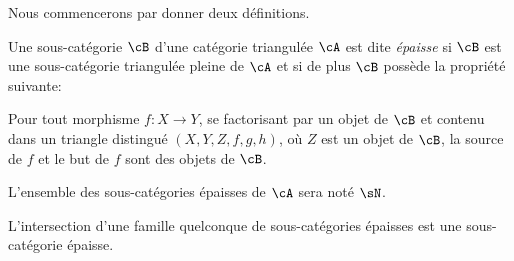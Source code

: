 Nous commencerons par donner deux définitions. 





\begin{definition}\label{VIII:2-1-1}
Une sous-catégorie $\cB$ d'une catégorie triangulée $\cA$ est dite 
\emph{épaisse} si $\cB$ est une sous-catégorie triangulée pleine de $\cA$ 
et si de plus $\cB$ possède la propriété suivante: 

Pour tout morphisme $f:X\to Y$, se factorisant par un objet de $\cB$ et contenu 
dans un triangle distingué $(X,Y,Z,f,g,h)$, où $Z$ est un objet de $\cB$, 
la source de $f$ et le but de $f$ sont des objets de $\cB$. 
\end{definition}

L'ensemble des sous-catégories épaisses de $\cA$ sera noté $\sN$. 

L'intersection d'une famille quelconque de sous-catégories épaisses est 
une sous-catégorie épaisse. 





